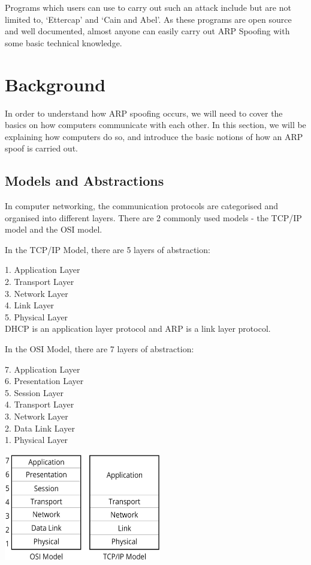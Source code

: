 \documentclass{acm_proc_article-sp}
\begin{document}
Programs which users can use to carry out such an attack include but are not limited to, `Ettercap' and `Cain and Abel'. As these programs are open source and well documented, almost anyone can easily carry out ARP Spoofing with some basic technical knowledge. 

\newpage

\section{Background}
In order to understand how ARP spoofing occurs, we will need to cover the basics on how computers communicate with each other. In this section, we will be explaining how computers do so, and introduce the basic notions of how an ARP spoof is carried out. 

\subsection{Models and Abstractions}
In computer networking, the communication protocols are categorised and organised into different layers. There are 2 commonly used models - the TCP/IP model and the OSI model. 

In the TCP/IP Model, there are 5 layers of abstraction: 

1. Application Layer\\
2. Transport Layer\\
3. Network Layer\\
4. Link Layer\\
5. Physical Layer\\

DHCP is an application layer protocol and ARP is a link layer protocol.

In the OSI Model, there are 7 layers of abstraction:

7. Application Layer \\
6. Presentation Layer \\
5. Session Layer \\
4. Transport Layer \\
3. Network Layer \\
2. Data Link Layer \\
1. Physical Layer 

\includegraphics[width=2.7in]{osi_comparison.eps}
\end{document}
